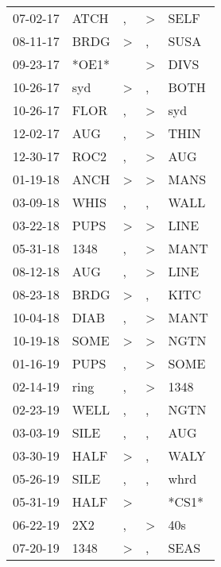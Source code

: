 \begin{supertabular}{lllll}
 07-02-17 &   ATCH &                , &     \textgreater &   SELF \\
 08-11-17 &   BRDG &     \textgreater &                , &   SUSA \\
 09-23-17 &  *OE1* &                  &     \textgreater &   DIVS \\
 10-26-17 &    syd &     \textgreater &                , &   BOTH \\
 10-26-17 &   FLOR &                , &     \textgreater &    syd \\
 12-02-17 &    AUG &                , &     \textgreater &   THIN \\
 12-30-17 &   ROC2 &                , &     \textgreater &    AUG \\
 01-19-18 &   ANCH &     \textgreater &     \textgreater &   MANS \\
 03-09-18 &   WHIS &                , &                , &   WALL \\
 03-22-18 &   PUPS &     \textgreater &     \textgreater &   LINE \\
 05-31-18 &   1348 &                , &     \textgreater &   MANT \\
 08-12-18 &    AUG &                , &     \textgreater &   LINE \\
 08-23-18 &   BRDG &     \textgreater &                , &   KITC \\
 10-04-18 &   DIAB &                , &     \textgreater &   MANT \\
 10-19-18 &   SOME &     \textgreater &     \textgreater &   NGTN \\
 01-16-19 &   PUPS &                , &     \textgreater &   SOME \\
 02-14-19 &   ring &                , &     \textgreater &   1348 \\
 02-23-19 &   WELL &                , &                , &   NGTN \\
 03-03-19 &   SILE &                , &                , &    AUG \\
 03-30-19 &   HALF &     \textgreater &                , &   WALY \\
 05-26-19 &   SILE &                , &                , &   whrd \\
 05-31-19 &   HALF &     \textgreater &                  &  *CS1* \\
 06-22-19 &    2X2 &                , &     \textgreater &    40s \\
 07-20-19 &   1348 &     \textgreater &                , &   SEAS \\

\end{supertabular}
